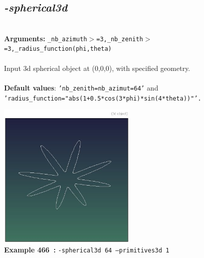 \documentclass[a4paper,11pt,twoside]{book}
\begin{document}
\subsection{\emph{-spherical3d} }\vspace*{-0.5em}
~\\\textbf{Arguments: } 
{\small \texttt{\_nb\_azimuth$>$=3,\_nb\_zenith$>$=3,\_radius\_function(phi,theta)}}\\~\\
Input 3d spherical object at (0,0,0), with specified geometry.
~\\~\\\textbf{Default values}: {\small \texttt{'nb\_zenith=nb\_azimut=64'} and \texttt{'radius\_function="abs(1+0.5*cos(3*phi)*sin(4*theta))"'.}}
\begin{center}\includegraphics[keepaspectratio=true,height=7cm,width=\textwidth]{img/gmic_def466.jpg}\\
{\footnotesize \textbf{Example 466~:} \texttt{-spherical3d 64 --primitives3d 1}}
\end{center}
\end{document}
